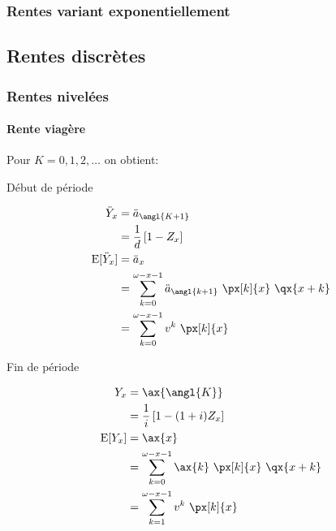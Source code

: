 \documentclass[10pt, french]{article}
\begin{document}
\begin{multicols*}{3}
\subsubsection*{\textcolor{amber(sae/ece)}{Rentes variant exponentiellement}}


\subsection*{Rentes discrètes}

\subsubsection*{\textcolor{amber(sae/ece)}{Rentes nivelées}}

\paragraph{Rente viagère}
Pour $K = 0, 1, 2,\dots$ on obtient:

\begin{minipage}[t]{0.5\columnwidth}
\begin{center}
Début de période
\end{center}
\begin{align*}
	\ddot{Y}_{x}
	&=	\ddot{a}_{\angl{K + 1}}\\
	&=	\frac{1}{d} \left[ 1 - Z_{x} \right]	\\
	\text{E}[\ddot{Y}_{x}]	
	&=	\ddot{a}_{x}	\\
	&=	\sum_{k = 0}^{\omega - x - 1} \ddot{a}_{\angl{k + 1}} \ \px[k]{x} \ \qx{x + k}	\\
	&=	\sum_{k = 0}^{\omega - x - 1} v^{k} \ \px[k]{x}	
\end{align*}
\end{minipage}
\begin{minipage}[t]{0.5\columnwidth}
\begin{center}
Fin de période
\end{center}
\begin{align*}
	Y_{x}
	&=	\ax{\angl{K}}
\\
	&=	\frac{1}{i} \left[ 1 - (1 + i) Z_{x} \right]	\\
	\text{E}[Y_{x}]	
	&=	\ax{x}	\\
	&=	\sum_{k = 0}^{\omega - x - 1} \ax{k} \ \px[k]{x} \ \qx{x + k}	\\
	&=	\sum_{k = 1}^{\omega - x - 1} v^{k} \ \px[k]{x}
\end{align*}
\end{minipage}


\end{multicols*}
\end{document}

